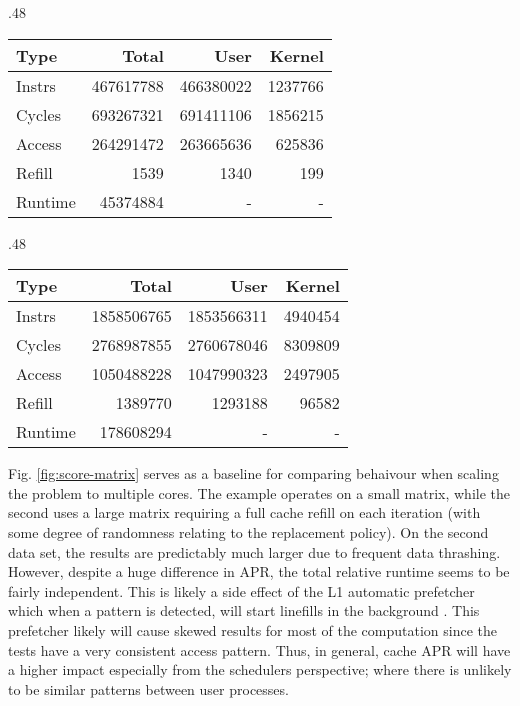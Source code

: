 \documentclass[11pt]{article}
\begin{document}
\begin{figure*}[!h]
	\caption{single core baseline comparison}
	\label{fig:score-matrix}	 
	\centering
	\begin{subtable}{.48\linewidth}
		\centering
		\begin{tabular}{ l|rrr }
			Type    & Total     & User      & Kernel  \\
			\hline
			Instrs  & 467617788 & 466380022 & 1237766 \\ 
			Cycles  & 693267321 & 691411106 & 1856215 \\ 
			Access  & 264291472 & 263665636 & 625836  \\ 
			Refill  & 1539      & 1340      & 199     \\ 
			Runtime & 45374884  & -         & -       \\ 
			\hline
		\end{tabular}
		\caption{single core - medium matrix}
	\end{subtable}
	\hfill
	\begin{subtable}{.48\linewidth}
		\centering
		\begin{tabular}{ l|rrr }
			Type    & Total      & User       & Kernel  \\
			\hline
			Instrs  & 1858506765 & 1853566311 & 4940454 \\ 
			Cycles  & 2768987855 & 2760678046 & 8309809 \\ 
			Access  & 1050488228 & 1047990323 & 2497905 \\ 
			Refill  & 1389770    & 1293188    & 96582   \\ 
			Runtime & 178608294  & -          & -       \\ 
			\hline
		\end{tabular}
		\caption{single core - large matrix}
	\end{subtable}
\end{figure*}

Fig. \ref{fig:score-matrix} serves as a baseline for comparing behaivour when scaling the problem to multiple cores.  The example operates on a small matrix, while the second uses a large matrix requiring a full cache refill on each iteration (with some degree of randomness relating to the replacement policy).  On the second data set, the results are predictably much larger due to frequent data thrashing.  However, despite a huge difference in APR, the total relative runtime seems to be fairly independent.  This is likely a side effect of the L1 automatic prefetcher which when a pattern is detected, will start linefills in the background \cite{arm-l1-prefetch}.  This prefetcher likely will cause skewed results for most of the computation since the tests have a very consistent access pattern.  Thus, in general, cache APR will have a higher impact especially from the schedulers perspective; where there is unlikely to be similar patterns between user processes. 
\end{document}
